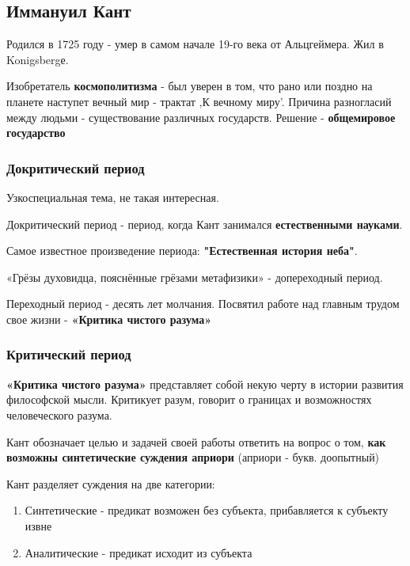 \documentclass{article}
\begin{document}
\subsection{Иммануил Кант}

\begin{flushleft}

Родился в 1725 году - умер в самом начале 19-го века от Альцгеймера. Жил в Konigsbergе.

Изобретатель \textbf{космополитизма} - был уверен в том, что рано или поздно на планете наступет вечный мир - трактат ,К вечному миру'. Причина разногласий между людьми - существование различных государств. Решение - \textbf{общемировое государство} 

\subsubsection{Докритический период}

Узкоспециальная тема, не такая интересная.

Докритический период - период, когда Кант занимался \textbf{естественными науками}.

Самое известное произведение периода: \textbf{"Естественная история неба"}.

\hfill

«Грёзы духовидца, пояснённые грёзами метафизики» - допереходный период.

\hfill

Переходный период - десять лет молчания. Посвятил работе над главным трудом свое жизни - \textbf{«Критика чистого разума»}

\subsubsection{Критический период}

\textbf{«Критика чистого разума»} представляет собой некую черту в истории развития философской мысли. Критикует разум, говорит о границах и возможностях человеческого разума.

Кант обозначает целью и задачей своей работы ответить на вопрос о том, \textbf{как возможны синтетические суждения априори} (априори - букв. доопытный)

Кант разделяет суждения на две категории:

\begin{enumerate}
    \item Синтетические - предикат возможен без субъекта, прибавляется к субъекту извне
    \item Аналитические - предикат исходит из субъекта
\end{enumerate}


\end{flushleft}
\end{document}
